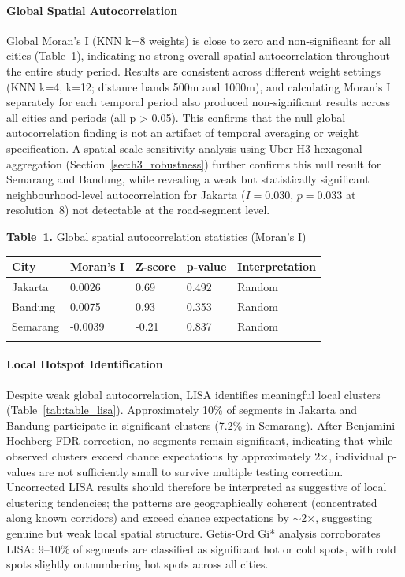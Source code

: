 \documentclass[12pt,a4paper]{article}
\begin{document}
\paragraph{Global Spatial Autocorrelation}

Global Moran's I (KNN k=8 weights) is close to zero and non-significant for all cities (Table~\ref{tab:table_moran}), indicating no strong overall spatial autocorrelation throughout the entire study period. Results are consistent across different weight settings (KNN k=4, k=12; distance bands 500m and 1000m), and calculating Moran's I separately for each temporal period also produced non-significant results across all cities and periods (all p > 0.05). This confirms that the null global autocorrelation finding is not an artifact of temporal averaging or weight specification. A spatial scale-sensitivity analysis using Uber H3 hexagonal aggregation 
(Section~\ref{sec:h3_robustness}) further confirms this null result for Semarang and Bandung, while revealing a weak but statistically significant neighbourhood-level autocorrelation for Jakarta ($I = 0.030$, $p = 0.033$ at resolution~8) not detectable at the road-segment level.

\FloatBarrier
\textbf{Table~\ref{tab:table_moran}.} Global spatial autocorrelation statistics (Moran's I)

\begin{longtable}[]{@{}lllll@{}}
\toprule\noalign{}
City & Moran's I & Z-score & p-value & Interpretation \\
\midrule\noalign{}
\endhead
\bottomrule\noalign{}
\endlastfoot
Jakarta & 0.0026 & 0.69 & 0.492 & Random \\
Bandung & 0.0075 & 0.93 & 0.353 & Random \\
Semarang & -0.0039 & -0.21 & 0.837 & Random \\
\label{tab:table_moran}
\end{longtable}
\FloatBarrier

\paragraph{Local Hotspot Identification}

Despite weak global autocorrelation, LISA identifies meaningful local clusters (Table~\ref{tab:table_lisa}). Approximately 10\% of segments in Jakarta and Bandung participate in significant clusters (7.2\% in Semarang). After Benjamini-Hochberg FDR correction, no segments remain significant, indicating that while observed clusters exceed chance expectations by approximately 2$\times$, individual p-values are not sufficiently small to survive multiple testing correction. Uncorrected LISA results should therefore be interpreted as suggestive of local clustering tendencies; the patterns are geographically coherent (concentrated along known corridors) and exceed chance expectations by $\sim$2$\times$, suggesting genuine but weak local spatial structure. Getis-Ord Gi* analysis corroborates LISA: 9--10\% of segments are classified as significant hot or cold spots, with cold spots slightly outnumbering hot spots across all cities.
\end{document}
